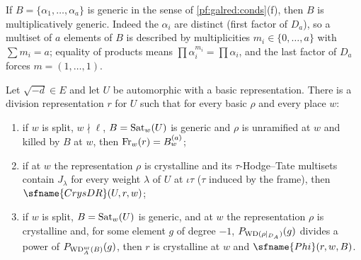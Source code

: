 If $B=\{\alpha_1,\dots,\alpha_a\}$ is generic in the sense of \cref{pf:galred:conds}(f), then $B$ is multiplicatively generic.
Indeed the $\alpha_i$ are distinct (first factor of $D_a$), so a multiset of $a$ elements of $B$ is described by multiplicities
$m_i\in\{0,\dots,a\}$ with $\sum m_i=a$; equality of products means $\prod\alpha_i^{m_i}=\prod\alpha_i$, and the last factor of
$D_a$ forces $m=(1,\dots,1)$.

\begin{proposition}\label{pf:galred:divall}
Let $\sqrt{-d}\in E$ and let $U$ be automorphic with a basic representation. There is a division representation $r$ for
$U$ such that for every basic $\rho$ and every place $w$:
\begin{enumerate}[label=(\roman*),nosep]
\item if $w$ is split, $w\nmid\ell$, $B=\operatorname{Sat}_w(U)$ is generic and $\rho$ is unramified at $w$ and killed by $B$ at $w$,
  then $\operatorname{Fr}_w(r)=B^{(a)}_w$;
\item if at $w$ the representation $\rho$ is crystalline and its $\tau$-Hodge--Tate multisets contain $J_\lambda$ for every
  weight $\lambda$ of $U$ at $\iota\tau$ ($\tau$ induced by the frame), then $\sfname{CrysDR}(U,r,w)$;
\item if $w$ is split, $B=\operatorname{Sat}_w(U)$ is generic, and at $w$ the representation $\rho$ is crystalline and, for some
  element $g$ of degree $-1$, $P_{\mathrm{WD}(\rho|_{D_A})}(g)$ divides a power of $P_{\mathrm{WD}^{\mathrm{ur}}_A(B)}(g)$, then $r$ is crystalline at $w$
  and $\sfname{Phi}(r,w,B)$.
\end{enumerate}
\end{proposition}

